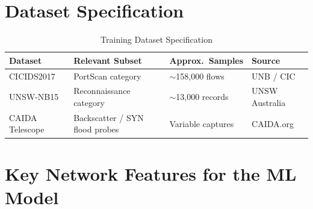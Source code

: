 \documentclass[12pt,a4paper]{report}
\begin{document}
\chapter{Dataset Specification}

\begin{table}[h!]
\centering
\caption{Training Dataset Specification}
\begin{tabular}{@{}L{3.5cm} L{4.5cm} C{3cm} L{3.5cm}@{}}
  \toprule
  \textbf{Dataset} & \textbf{Relevant Subset} & \textbf{Approx.\ Samples} & \textbf{Source} \\
  \midrule
  CICIDS2017   & PortScan category             & $\sim$158,000 flows  & UNB / CIC \\
  UNSW-NB15    & Reconnaissance category       & $\sim$13,000 records & UNSW Australia \\
  CAIDA Telescope & Backscatter / SYN flood probes & Variable captures & CAIDA.org \\
  \bottomrule
\end{tabular}
\label{tab:datasets}
\end{table}

\chapter{Key Network Features for the ML Model}
\end{document}

